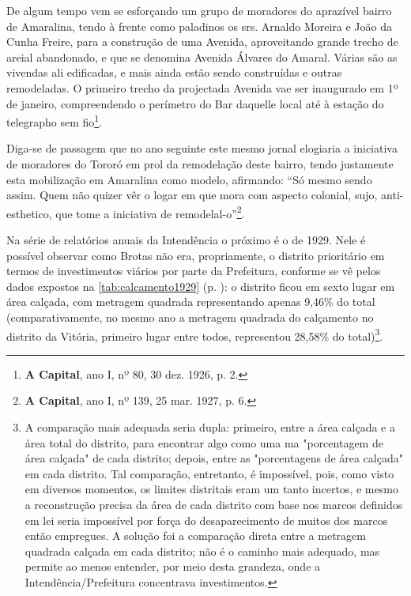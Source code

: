 \begin{citacao}
De algum tempo vem se esforçando um grupo de moradores do aprazível bairro de Amaralina, tendo à frente como paladinos os srs. Arnaldo Moreira e João da Cunha Freire, para a construção de uma Avenida, aproveitando grande trecho de areial abandonado, e que se denomina Avenida Álvares do Amaral.
Várias são as vivendas ali edificadas, e mais ainda estão sendo construídas e outras remodeladas.
O primeiro trecho da projectada Avenida vae ser inaugurado em 1º de janeiro, compreendendo o perímetro do Bar daquelle local até à estação do telegrapho sem fio\footnote{\textbf{A Capital}, ano I, nº 80, 30 dez. 1926, p. 2. }.
\end{citacao}

Diga-se de passagem que no ano seguinte este mesmo jornal elogiaria a iniciativa de moradores do Tororó em prol da remodelação deste bairro, tendo justamente esta mobilização em Amaralina como modelo, afirmando: ``Só mesmo sendo assim. Quem não quizer vêr o logar em que mora com aspecto colonial, sujo, anti-esthetico, que tome a iniciativa de remodelal-o''\footnote{\textbf{A Capital}, ano I, nº 139, 25 mar. 1927, p. 6.}.

Na série de relatórios anuais da Intendência o próximo é o de 1929. Nele é possível observar como Brotas não era, propriamente, o distrito prioritário em termos de investimentos viários por parte da Prefeitura, conforme se vê pelos dados expostos na \autoref{tab:calcamento1929} (p. \pageref{tab:calcamento1929}): o distrito ficou em sexto lugar em área calçada, com metragem quadrada representando apenas 9,46\% do total (comparativamente, no mesmo ano a metragem quadrada do calçamento no distrito da Vitória, primeiro lugar entre todos, representou 28,58\% do total)\footnote{A comparação mais adequada seria dupla: primeiro, entre a área calçada e a área total do distrito, para encontrar algo como uma ma "porcentagem de área calçada" de cada distrito; depois, entre as "porcentagens de área calçada" em cada distrito. Tal comparação, entretanto, é impossível, pois, como visto em diversos momentos, os limites distritais eram um tanto incertos, e mesmo a reconstrução precisa da área de cada distrito com base nos marcos definidos em lei seria impossível por força do desaparecimento de muitos dos marcos então empregues. A solução foi a comparação direta entre a metragem quadrada calçada em cada distrito; não é o caminho mais adequado, mas permite ao menos entender, por meio desta grandeza, onde a Intendência/Prefeitura concentrava investimentos.}.

